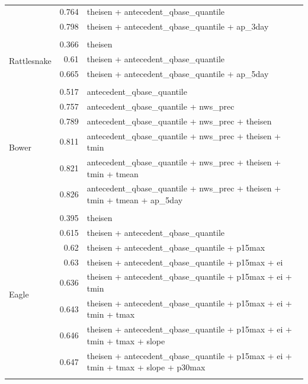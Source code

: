 \documentclass[10pt]{article}
\begin{document}
\begin{table}[h]
\begin{center}
\begin{tabular}{lrl}
 & 0.764 & theisen + antecedent\_qbase\_quantile\\ 
 & 0.798 & theisen + antecedent\_qbase\_quantile + ap\_3day\\ 
\vspace{2mm}\\ \multirow{4}{*}{Rattlesnake} & 0.366 & theisen\\ 
 & 0.61 & theisen + antecedent\_qbase\_quantile\\ 
 & 0.665 & theisen + antecedent\_qbase\_quantile + ap\_5day\\ 
\vspace{2mm}\\ \multirow{7}{*}{Bower} & 0.517 & antecedent\_qbase\_quantile\\ 
 & 0.757 & antecedent\_qbase\_quantile + nws\_prec\\ 
 & 0.789 & antecedent\_qbase\_quantile + nws\_prec + theisen\\ 
 & 0.811 & antecedent\_qbase\_quantile + nws\_prec + theisen + tmin\\ 
 & 0.821 & antecedent\_qbase\_quantile + nws\_prec + theisen + tmin + tmean\\ 
 & 0.826 & antecedent\_qbase\_quantile + nws\_prec + theisen + tmin + tmean + ap\_5day\\ 
\vspace{2mm}\\ \multirow{9}{*}{Eagle} & 0.395 & theisen\\ 
 & 0.615 & theisen + antecedent\_qbase\_quantile\\ 
 & 0.62 & theisen + antecedent\_qbase\_quantile + p15max\\ 
 & 0.63 & theisen + antecedent\_qbase\_quantile + p15max + ei\\ 
 & 0.636 & theisen + antecedent\_qbase\_quantile + p15max + ei + tmin\\ 
 & 0.643 & theisen + antecedent\_qbase\_quantile + p15max + ei + tmin + tmax\\ 
 & 0.646 & theisen + antecedent\_qbase\_quantile + p15max + ei + tmin + tmax + slope\\ 
 & 0.647 & theisen + antecedent\_qbase\_quantile + p15max + ei + tmin + tmax + slope + p30max\\ 
\vspace{2mm}\\     \end{tabular}
    \caption{\label{phos_r_square_nosnow}}
    \end{center}
\end{table}
\end{document}
